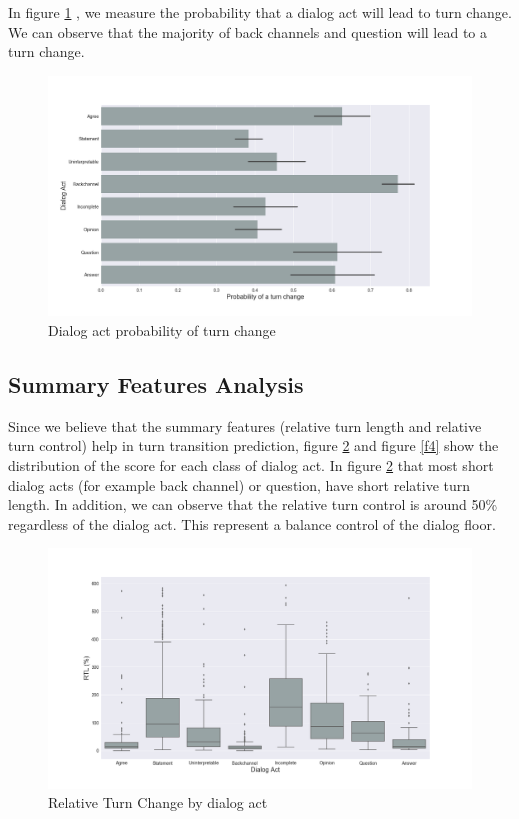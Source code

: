 In figure \ref{f2} , we measure the probability that a dialog act will lead to turn change. We can observe that the majority of back channels and question will lead to a turn change.

\begin{figure}[ht!]
\centering
\includegraphics[width=\textwidth]{../scikitlearn/figures/f2.png}
\caption{Dialog act probability of turn change\label{overflow}}
\label{f2}
\end{figure}

\subsection{Summary Features Analysis}

Since we believe that the summary features (relative turn length and relative turn control) help in
turn transition prediction, figure \ref{f3} and figure \ref{f4} show the distribution of the score for
each class of dialog act. In figure \ref{f3} that most short dialog acts (for example back channel)
or question, have short relative turn length.
In addition, we can observe that the relative turn control is around 50\% regardless of the dialog act. This represent a balance control of the dialog floor.

\begin{figure}[ht!]
 \centering
 \includegraphics[width=\textwidth]{../scikitlearn/figures/f3.png}
 \caption{Relative Turn Change by dialog act\label{overflow}}
 \label{f3}
 \end{figure}




